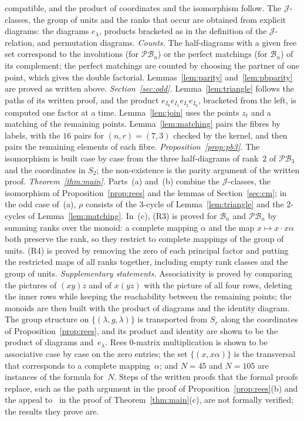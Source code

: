\documentclass[11pt]{article}
\theoremstyle{remark}
\newcommand{\B}{\mathcal B}
\newcommand{\PB}{\mathcal{PB}}
\begin{document}
compatible, and the product of coordinates and the isomorphism follow. The
$\mathcal J$-classes, the group of units and the ranks that occur are obtained
from explicit diagrams: the diagrams $e_\lambda$, products bracketed as in the
definition of the $\mathcal J$-relation, and permutation diagrams.
\emph{Counts.} The half-diagrams with a given free set correspond to the
involutions (for $\PB_n$) or the perfect matchings (for $\B_n$) of its
complement; the perfect matchings are counted by choosing the partner of one
point, which gives the double factorial. Lemmas~\ref{lem:parity}
and~\ref{lem:pbparity} are proved as written above.
\emph{Section~\ref{sec:odd}.} Lemma~\ref{lem:triangle} follows the paths of its
written proof, and the product $e_{I_0}e_{I_1}e_{I_2}e_{I_0}$, bracketed from
the left, is computed one factor at a time. Lemma~\ref{lem:join} uses the
points $z_t$ and a matching of the remaining points. Lemma~\ref{lem:matching}
pairs the fibres by labels, with the $16$ pairs for $(n,r)=(7,3)$ checked by
the kernel, and then pairs the remaining elements of each fibre.
\emph{Proposition~\ref{prop:pb3}.} The isomorphism is built case by case from
the three half-diagrams of rank~$2$ of $\PB_3$ and the coordinates in $S_2$;
the non-existence is the parity argument of the written proof.
\emph{Theorem~\ref{thm:main}.} Parts~(a) and~(b) combine the
$\mathcal J$-classes, the isomorphism of Proposition~\ref{prop:rees} and the
lemmas of Section~\ref{sec:cm}; in the odd case of~(a), $\rho$ consists of the
$3$-cycle of Lemma~\ref{lem:triangle} and the $2$-cycles of
Lemma~\ref{lem:matching}. In~(c), (R3) is proved for $\B_n$ and $\PB_n$ by
summing ranks over the monoid: a complete mapping $\alpha$ and the map
$x\mapsto x\cdot x\alpha$ both preserve the rank, so they restrict to complete
mappings of the group of units. (R4) is proved by removing the zero of each
principal factor and putting the restricted maps of all ranks together,
including empty rank classes and the group of units.
\emph{Supplementary statements.} Associativity is proved by comparing the
pictures of $(xy)z$ and of $x(yz)$ with the picture of all four rows, deleting
the inner rows while keeping the reachability between the remaining points;
the monoids are then built with the product of diagrams and the identity
diagram. The group structure on $\{(\lambda,g,\lambda)\}$ is transported from
$S_r$ along the coordinates of Proposition~\ref{prop:rees}, and its product and
identity are shown to be the product of diagrams and~$e_\lambda$. Rees
$0$-matrix multiplication is shown to be associative case by case on the zero
entries; the set $\{(x,x\alpha)\}$ is the transversal that corresponds to a
complete mapping~$\alpha$; and $N=45$ and $N=105$ are instances of the formula
for~$N$.
Steps of the written proofs that the formal proofs replace, such as the path
argument in the proof of Proposition~\ref{prop:rees}(b) and the appeal
to~\cite[Corollary~3.4 and Theorem~4.4]{abchk} in the proof of
Theorem~\ref{thm:main}(c), are not formally verified; the results they prove
are.
\end{document}
